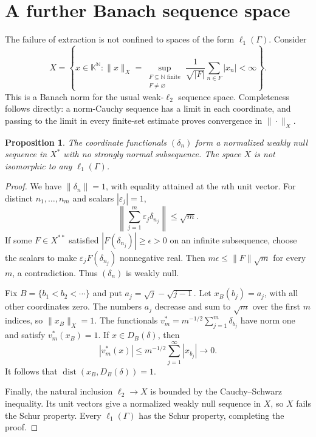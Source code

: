 \documentclass[11pt,a4paper]{amsart}
\newtheorem{proposition}[theorem]{Proposition}
\theoremstyle{remark}
\newcommand{\N}{\mathbb N}
\newcommand{\K}{\mathbb K}
\DeclareMathOperator{\dist}{dist}
\begin{document}
\section{A further Banach sequence space}\label{sec:sequence-space}

The failure of extraction is not confined to spaces of the form
$\ell_1(\Gamma)$. Consider
\[
 X=\left\{x\in\K^{\N}:\|x\|_X=
 \sup_{\substack{F\subseteq\N\text{ finite}\\F\neq\varnothing}}
 \frac1{\sqrt{|F|}}\sum_{n\in F}|x_n|<\infty\right\}.
\]
This is a Banach norm for the usual weak-$\ell_2$ sequence space.
Completeness follows directly: a norm-Cauchy sequence has a limit in
each coordinate, and passing to the limit in every finite-set estimate
proves convergence in $\|\cdot\|_X$.

\begin{proposition}\label{prop:marcinkiewicz}
The coordinate functionals $(\delta_n)$ form a normalized weakly null
sequence in $X^*$ with no strongly normal subsequence. The space $X$
is not isomorphic to any $\ell_1(\Gamma)$.
\end{proposition}

\begin{proof}
We have $\|\delta_n\|=1$, with equality attained at the $n$th unit
vector. For distinct $n_1,\ldots,n_m$ and scalars $|\varepsilon_j|=1$,
\[
 \left\|\sum_{j=1}^m\varepsilon_j\delta_{n_j}\right\|\leqslant\sqrt m.
\]
If some $F\in X^{**}$ satisfied $|F(\delta_{n_j})|\geqslant\epsilon>0$
on an infinite subsequence, choose the scalars to make
$\varepsilon_jF(\delta_{n_j})$ nonnegative real. Then
$m\epsilon\leqslant\|F\|\sqrt m$ for every $m$, a contradiction.
Thus $(\delta_n)$ is weakly null.

Fix $B=\{b_1<b_2<\cdots\}$ and put
$a_j=\sqrt j-\sqrt{j-1}$. Let $x_B(b_j)=a_j$, with all other
coordinates zero. The numbers $a_j$ decrease and sum to $\sqrt m$
over the first $m$ indices, so $\|x_B\|_X=1$. The functionals
$v_m^*=m^{-1/2}\sum_{j=1}^m\delta_{b_j}$ have norm one and satisfy
$v_m^*(x_B)=1$. If $x\in D_B(\delta)$, then
\[
 |v_m^*(x)|\leqslant m^{-1/2}\sum_{j=1}^{\infty}|x_{b_j}|
 \longrightarrow0.
\]
It follows that $\dist(x_B,D_B(\delta))=1$.

Finally, the natural inclusion $\ell_2\to X$ is bounded by the
Cauchy--Schwarz inequality. Its unit vectors give a normalized weakly
null sequence in $X$, so $X$ fails the Schur property. Every
$\ell_1(\Gamma)$ has the Schur property, completing the proof.
\end{proof}
\end{document}
